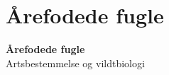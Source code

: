 \section{Årefodede fugle}

\begin{frame}
  \vspace{3em}
  \begin{center}
    {\LARGE \textbf{Årefodede fugle}}
    \vspace{2em}
    \\ Artsbestemmelse og vildtbiologi
\par
{\normalsize }
\vspace{1em}
\par
  \end{center}
\end{frame}

